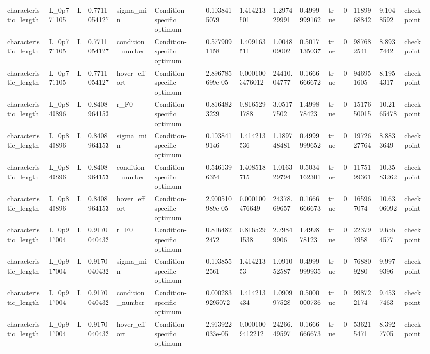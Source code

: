\begin{tabular}{@{}lllllllllllllll@{}}
characteristic\_length & L\_0p771105 & L & 0.7711054127 & sigma\_min & Condition-specific optimum & 0.1038415079 & 1.414213501 & 1.297429991 & 0.4999999162 & true & 0 & 1189968842 & 9.1048592 & checkpoint \\
characteristic\_length & L\_0p771105 & L & 0.7711054127 & condition\_number & Condition-specific optimum & 0.5779091158 & 1.409163511 & 1.004809002 & 0.5017135037 & true & 0 & 987682541 & 8.8937442 & checkpoint \\
characteristic\_length & L\_0p771105 & L & 0.7711054127 & hover\_effort & Condition-specific optimum & 2.896785699e-05 & 0.0001003476012 & 24410.04777 & 0.1666666672 & true & 0 & 946951605 & 8.1954317 & checkpoint \\
characteristic\_length & L\_0p840896 & L & 0.8408964153 & r\_F0 & Condition-specific optimum & 0.8164823229 & 0.8165291788 & 3.05177502 & 1.499878423 & true & 0 & 1517650015 & 10.2165478 & checkpoint \\
characteristic\_length & L\_0p840896 & L & 0.8408964153 & sigma\_min & Condition-specific optimum & 0.1038419146 & 1.414213536 & 1.189748481 & 0.4999999652 & true & 0 & 1972627764 & 8.8833649 & checkpoint \\
characteristic\_length & L\_0p840896 & L & 0.8408964153 & condition\_number & Condition-specific optimum & 0.5461396354 & 1.408518715 & 1.016329794 & 0.5034162301 & true & 0 & 1175199361 & 10.3583262 & checkpoint \\
characteristic\_length & L\_0p840896 & L & 0.8408964153 & hover\_effort & Condition-specific optimum & 2.900510989e-05 & 0.000100476649 & 24378.69657 & 0.1666666673 & true & 0 & 165967074 & 10.6306092 & checkpoint \\
characteristic\_length & L\_0p917004 & L & 0.9170040432 & r\_F0 & Condition-specific optimum & 0.8164822472 & 0.8165291538 & 2.79849906 & 1.499878123 & true & 0 & 223797958 & 9.6554577 & checkpoint \\
characteristic\_length & L\_0p917004 & L & 0.9170040432 & sigma\_min & Condition-specific optimum & 0.1038552561 & 1.41421353 & 1.091052587 & 0.4999999935 & true & 0 & 768809280 & 9.9979396 & checkpoint \\
characteristic\_length & L\_0p917004 & L & 0.9170040432 & condition\_number & Condition-specific optimum & 0.0002839295072 & 1.414213434 & 1.090997528 & 0.5000000736 & true & 0 & 998722174 & 9.4537463 & checkpoint \\
characteristic\_length & L\_0p917004 & L & 0.9170040432 & hover\_effort & Condition-specific optimum & 2.913922033e-05 & 0.0001009412212 & 24266.49597 & 0.1666666673 & true & 0 & 536215471 & 8.3927705 & checkpoint \\

\end{tabular}
